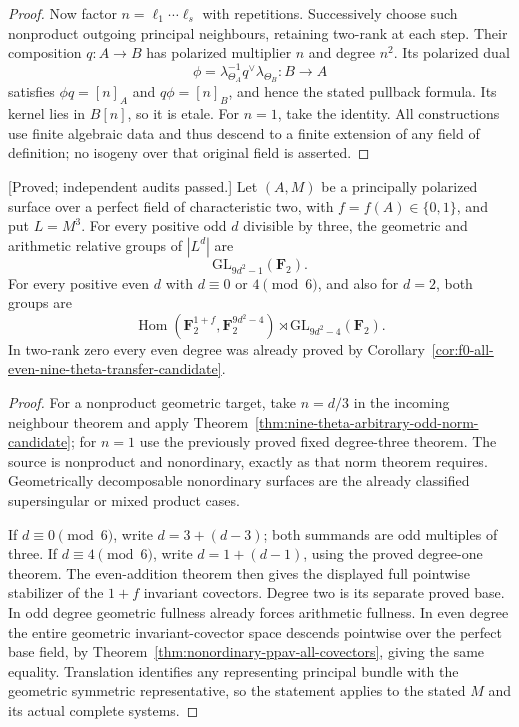 \begin{proof}
Now factor $n=\ell_1\cdots\ell_s$ with repetitions. Successively
choose such nonproduct outgoing principal neighbours, retaining
two-rank at each step. Their composition $q:A\to B$ has polarized
multiplier $n$ and degree $n^2$. Its polarized dual
\[
           \phi=\lambda_{\Theta_A}^{-1}q^\vee\lambda_{\Theta_B}
                     :B\longrightarrow A
\]
satisfies $\phi q=[n]_A$ and $q\phi=[n]_B$, and hence the stated
pullback formula. Its kernel lies in $B[n]$, so it is etale.
For $n=1$, take the identity. All constructions use finite algebraic
data and thus descend to a finite extension of any field of
definition; no isogeny over that original field is asserted.
\end{proof}

\begin{corollary}
\label{cor:nonordinary-all-odd-multiples-three-candidate}
\textup{[Proved; independent audits passed.]}
Let $(A,M)$ be a principally polarized surface over a perfect field
of characteristic two, with $f=f(A)\in\{0,1\}$, and put $L=M^3$.
For every positive odd $d$ divisible by three, the geometric and
arithmetic relative groups of $|L^d|$ are
\[
                         \mathrm{GL}_{9d^2-1}(\mathbf F_2).
\]
For every positive even $d$ with $d\equiv0$ or $4\pmod6$, and also
for $d=2$, both groups are
\[
 \operatorname{Hom}(\mathbf F_2^{1+f},\mathbf F_2^{9d^2-4})
                  \rtimes\mathrm{GL}_{9d^2-4}(\mathbf F_2).
\]
In two-rank zero every even degree was already proved by
Corollary~\ref{cor:f0-all-even-nine-theta-transfer-candidate}.
\end{corollary}

\begin{proof}
For a nonproduct geometric target, take $n=d/3$ in the incoming
neighbour theorem and apply
Theorem~\ref{thm:nine-theta-arbitrary-odd-norm-candidate}; for $n=1$
use the previously proved fixed degree-three theorem. The source
is nonproduct and nonordinary, exactly as that norm theorem requires.
Geometrically decomposable nonordinary surfaces are the already
classified supersingular or mixed product cases.

If $d\equiv0\pmod6$, write $d=3+(d-3)$; both summands are odd
multiples of three. If $d\equiv4\pmod6$, write $d=1+(d-1)$,
using the proved degree-one theorem. The even-addition theorem
then gives the displayed full pointwise stabilizer of the
$1+f$ invariant covectors. Degree two is its separate proved base.
In odd degree geometric fullness already forces arithmetic
fullness. In even degree the entire geometric invariant-covector space
descends pointwise over the perfect base field, by
Theorem~\ref{thm:nonordinary-ppav-all-covectors}, giving the
same equality. Translation
identifies any representing principal bundle with the geometric
symmetric representative, so the statement applies to the stated
$M$ and its actual complete systems.
\end{proof}

